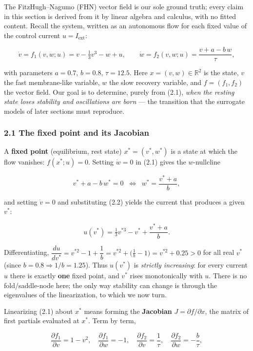 \documentclass[
  11pt,
]{article}
\begin{document}
The FitzHugh--Nagumo (FHN) vector field is our sole ground truth; every
claim in this section is derived from it by linear algebra and calculus,
with no fitted content. Recall the system, written as an autonomous flow
for each fixed value of the control current \(u = I_{\text{ext}}\):

\[
\dot v = f_1(v,w;u) = v - \tfrac{1}{3}v^3 - w + u, \qquad
\dot w = f_2(v,w;u) = \frac{v + a - b\,w}{\tau},
\tag{2.1}
\]

with parameters \(a = 0.7\), \(b = 0.8\), \(\tau = 12.5\). Here
\(x = (v,w) \in \mathbb{R}^2\) is the state, \(v\) the fast
membrane-like variable, \(w\) the slow recovery variable, and
\(f = (f_1,f_2)\) the vector field. Our goal is to determine, purely
from (2.1), \emph{when the resting state loses stability and
oscillations are born} --- the transition that the surrogate models of
later sections must reproduce.

\subsubsection{2.1 The fixed point and its
Jacobian}\label{the-fixed-point-and-its-jacobian}

A \textbf{fixed point} (equilibrium, rest state) \(x^* = (v^*, w^*)\) is
a state at which the flow vanishes: \(f(x^*;u) = 0\). Setting
\(\dot w = 0\) in (2.1) gives the \(w\)-nullcline

\[
v^* + a - b\,w^* = 0 \;\;\Longleftrightarrow\;\; w^* = \frac{v^* + a}{b},
\tag{2.2}
\]

and setting \(\dot v = 0\) and substituting (2.2) yields the current
that produces a given \(v^*\):

\[
u(v^*) = \tfrac{1}{3}v^{*3} - v^* + \frac{v^* + a}{b}.
\tag{2.3}
\]

Differentiating,
\(\dfrac{du}{dv^*} = v^{*2} - 1 + \dfrac{1}{b} = v^{*2} + \big(\tfrac{1}{b}-1\big)
= v^{*2} + 0.25 > 0\) for all real \(v^*\) (since
\(b = 0.8 \Rightarrow 1/b = 1.25\)). Thus \(u(v^*)\) is \emph{strictly
increasing}: for every current \(u\) there is exactly \textbf{one} fixed
point, and \(v^*\) rises monotonically with \(u\). There is no
fold/saddle-node here; the only way stability can change is through the
eigenvalues of the linearization, to which we now turn.

Linearizing (2.1) about \(x^*\) means forming the \textbf{Jacobian}
\(J = \partial f / \partial x\), the matrix of first partials evaluated
at \(x^*\). Term by term,

\[
\frac{\partial f_1}{\partial v} = 1 - v^2,\quad
\frac{\partial f_1}{\partial w} = -1,\quad
\frac{\partial f_2}{\partial v} = \frac{1}{\tau},\quad
\frac{\partial f_2}{\partial w} = -\frac{b}{\tau},
\]
\end{document}
